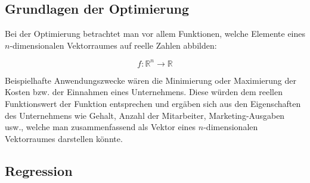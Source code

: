 \subsection{Grundlagen der Optimierung}
Bei der Optimierung betrachtet man vor allem Funktionen, welche Elemente eines $n$-dimensionalen Vektorraumes auf reelle Zahlen abbilden:

\begin{equation*}
f: \mathbb{R}^n \rightarrow \mathbb{R}
\end{equation*}

Beispielhafte Anwendungszwecke wären die Minimierung oder Maximierung der Kosten bzw. der Einnahmen eines Unternehmens. Diese würden dem reellen Funktionswert der Funktion entsprechen und ergäben sich aus den Eigenschaften des Unternehmens wie Gehalt, Anzahl der Mitarbeiter, Marketing-Ausgaben usw., welche man zusammenfassend als Vektor eines $n$-dimensionalen Vektorraumes darstellen könnte.

\subsection{Regression}

